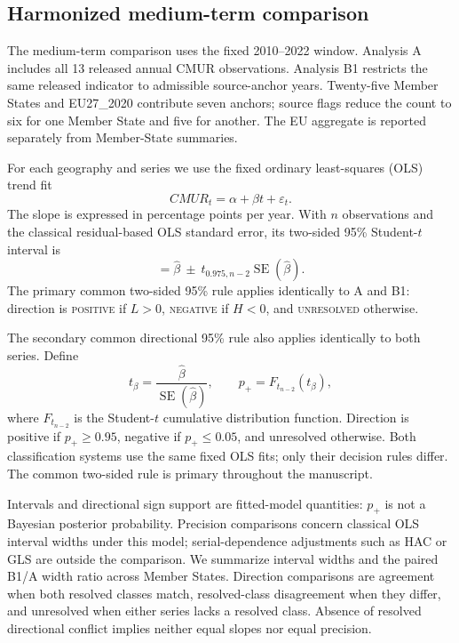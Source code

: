 \subsection{Harmonized medium-term comparison}
\label{sec:mediumterm}

The medium-term comparison uses the fixed 2010--2022 window. Analysis A includes all 13 released annual CMUR observations. Analysis B1 restricts the same released indicator to admissible source-anchor years. Twenty-five Member States and EU27\_2020 contribute seven anchors; source flags reduce the count to six for one Member State and five for another. The EU aggregate is reported separately from Member-State summaries.

For each geography and series we use the fixed ordinary least-squares (OLS) trend fit
\begin{equation}
CMUR_t=\alpha+\beta t+\varepsilon_t.
\end{equation}
The slope is expressed in percentage points per year. With $n$ observations and the classical residual-based OLS standard error, its two-sided 95\% Student-$t$ interval is
\begin{equation}
[L,H]=\widehat\beta\ \pm\ t_{0.975,n-2}\operatorname{SE}(\widehat\beta).
\end{equation}
The primary common two-sided 95\% rule applies identically to A and B1: direction is \textsc{positive} if $L>0$, \textsc{negative} if $H<0$, and \textsc{unresolved} otherwise.

The secondary common directional 95\% rule also applies identically to both series. Define
\begin{equation}
t_\beta=\frac{\widehat\beta}{\operatorname{SE}(\widehat\beta)},\qquad
p_+=F_{t_{n-2}}(t_\beta),
\end{equation}
where $F_{t_{n-2}}$ is the Student-$t$ cumulative distribution function. Direction is positive if $p_+\geq0.95$, negative if $p_+\leq0.05$, and unresolved otherwise. Both classification systems use the same fixed OLS fits; only their decision rules differ. The common two-sided rule is primary throughout the manuscript.

Intervals and directional sign support are fitted-model quantities: $p_+$ is not a Bayesian posterior probability. Precision comparisons concern classical OLS interval widths under this model; serial-dependence adjustments such as HAC or GLS are outside the comparison. We summarize interval widths and the paired B1/A width ratio across Member States. Direction comparisons are agreement when both resolved classes match, resolved-class disagreement when they differ, and unresolved when either series lacks a resolved class. Absence of resolved directional conflict implies neither equal slopes nor equal precision.

